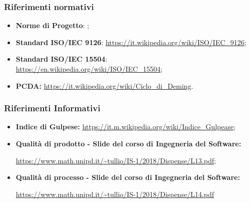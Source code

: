         \subsubsection{Riferimenti normativi}
        \begin{itemize}
            \item \textbf{Norme di Progetto}: \docNameVersionNdP;
            \item \textbf{Standard ISO/IEC 9126}: \url{https://it.wikipedia.org/wiki/ISO/IEC_9126};
            \item \textbf{Standard ISO/IEC 15504}: \url{https://en.wikipedia.org/wiki/ISO/IEC_15504};
            \item \textbf{PCDA: } \url{https://it.wikipedia.org/wiki/Ciclo_di_Deming}.
        \end{itemize}
    
        \subsubsection{Riferimenti Informativi}
            \begin{itemize}
                \item \textbf{Indice di Gulpese: } 
                \url{https://it.m.wikipedia.org/wiki/Indice_Gulpease};
                \item \textbf{Qualità di prodotto - Slide del corso di Ingegneria del Software: }
                
                \url{https://www.math.unipd.it/~tullio/IS-1/2018/Dispense/L13.pdf};
                \item \textbf{Qualità di processo - Slide del corso di Ingegneria del Software: }
                    
                \url{https://www.math.unipd.it/~tullio/IS-1/2018/Dispense/L14.pdf}
            \end{itemize} 
       
